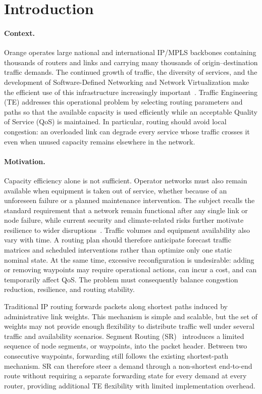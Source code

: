 \section{Introduction}

\paragraph{Context.}
Orange operates large national and international IP/MPLS backbones containing thousands of routers
and links and carrying many thousands of origin--destination traffic demands. The continued growth
of traffic, the diversity of services, and the development of Software-Defined Networking and Network
Virtualization make the efficient use of this infrastructure increasingly important~\citep{orange2026}.
Traffic Engineering (TE) addresses this operational problem by selecting routing parameters and paths
so that the available capacity is used efficiently while an acceptable Quality of Service (QoS) is
maintained. In particular, routing should avoid local congestion: an overloaded link can degrade every
service whose traffic crosses it even when unused capacity remains elsewhere in the network.

\paragraph{Motivation.}
Capacity efficiency alone is not sufficient. Operator networks must also remain available when
equipment is taken out of service, whether because of an unforeseen failure or a planned maintenance
intervention. The subject recalls the standard requirement that a network remain functional after any
single link or node failure, while current security and climate-related risks further motivate
resilience to wider disruptions~\citep{orange2026}. Traffic volumes and equipment availability also
vary with time. A routing plan should therefore anticipate forecast traffic matrices and scheduled
interventions rather than optimize only one static nominal state. At the same time, excessive
reconfiguration is undesirable: adding or removing waypoints may require operational actions, can
incur a cost, and can temporarily affect QoS. The problem must consequently balance congestion
reduction, resilience, and routing stability.

Traditional IP routing forwards packets along shortest paths induced by administrative link weights.
This mechanism is simple and scalable, but the set of weights may not provide enough flexibility to
distribute traffic well under several traffic and availability scenarios. Segment Routing
(SR)~\citep{rfc8402} introduces a limited sequence of node segments, or waypoints, into the packet
header. Between two consecutive waypoints, forwarding still follows the existing shortest-path
mechanism. SR can therefore steer a demand through a non-shortest end-to-end route without requiring
a separate forwarding state for every demand at every router, providing additional TE flexibility
with limited implementation overhead.

